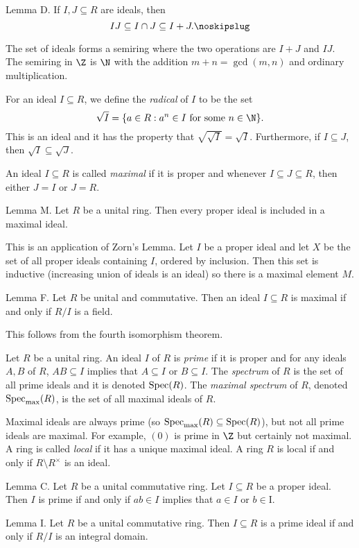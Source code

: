 \proclaim Lemma D. If $I,J\subseteq R$ are ideals, then
$$IJ \subseteq I\cap J \subseteq I+J.\noskipslug$$

The set of ideals forms a semiring where the two operations are $I+J$ and $IJ$. The semiring in $\Z$ is $\N$ with the addition $m + n = \gcd(m,n)$ and ordinary multiplication.

For an ideal $I\subseteq R$, we define the {\it radical} of $I$ to be the set
$$\sqrt{I} = \{a \in R : a^n \in I\ \hbox{for some}\ n\in \N\}.$$
This is an ideal and it has the property that $\sqrt{\sqrt{I}} = \sqrt{I}$. Furthermore, if $I\subseteq J$, then $\sqrt{I} \subseteq \sqrt{J}$.

An ideal $I\subseteq R$ is called {\it maximal} if it is proper and whenever $I\subseteq J\subseteq R$, then either $J = I$ or $J=R$.

\proclaim Lemma M. Let $R$ be a unital ring. Then every proper ideal is included in a maximal ideal.

\proof This is an application of Zorn's Lemma. Let $I$ be a proper ideal and let $X$ be the set of all proper ideals containing $I$, ordered by inclusion. Then this set is inductive (increasing union of ideals is an ideal) so there is a maximal element $M$.\slug

\proclaim Lemma F. Let $R$ be unital and commutative. Then an ideal $I\subseteq R$ is maximal if and only if $R/I$ is a field.

\proof This follows from the fourth isomorphism theorem.\slug

Let $R$ be a unital ring. An ideal $I$ of $R$ is {\it prime} if it is proper and for any ideals $A,B$ of $R$, $AB\subseteq I$ implies that $A\subseteq I$ or $B\subseteq I$. The {\it spectrum} of $R$ is the set of all prime ideals and it is denoted $\mathop {\rm Spec}(R)$. The {\it maximal spectrum} of $R$, denoted $\mathop {\rm Spec}_{\max}(R)$, is the set of all maximal ideals of $R$.

Maximal ideals are always prime (so $\mathop {\rm Spec}_{\max}(R) \subseteq \mathop {\rm Spec}(R)$), but not all prime ideals are maximal. For example, $(0)$ is prime in $\Z$ but certainly not maximal. A ring is called {\it local} if it has a unique maximal ideal. A ring $R$ is local if and only if $R\setminus R^\times$ is an ideal.

\proclaim Lemma C. Let $R$ be a unital commutative ring. Let $I\subseteq R$ be a proper ideal. Then $I$ is prime if and only if $ab\in I$ implies that $a\in I$ or $b\in $I.\slug

\proclaim Lemma I. Let $R$ be a unital commutative ring. Then $I\subseteq R$ is a prime ideal if and only if $R/I$ is an integral domain.\slug

